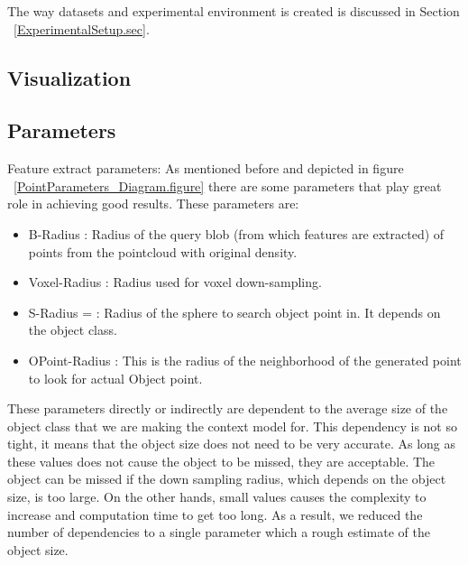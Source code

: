 The way datasets and experimental environment is created is discussed in Section ~\ref{ExperimentalSetup.sec}.


\subsection{Visualization}
\label{visualization.ssec}



\subsection{Parameters}
\label{Parameters.ssec}

Feature extract parameters:
As mentioned before and depicted in figure ~\ref{PointParameters_Diagram.figure} there are some parameters that play great role in
achieving good results. 
These parameters are:

\begin{itemize}
 \item  B-Radius : Radius of the query blob (from which features are extracted) of points from the pointcloud with original
 density.
 \item Voxel-Radius : Radius used for voxel down-sampling. 
 \item S-Radius = : Radius of the sphere to search object point in. 
 It depends on the object class.
 \item OPoint-Radius : This is the radius of the neighborhood of the generated point to look for actual Object point.
\end{itemize}

These parameters directly or indirectly are dependent to the average size of the object class that we are making the context model
for. 
This dependency is not so tight, it means that the object size does not need to be very accurate. 
As long as these values does not cause the object to be missed, they are acceptable.
The object can be missed if the down sampling radius, which depends on the object size, is too large. 
On the other hands, small values causes the complexity to increase and computation time to get too long.  
As a result, we reduced the number of dependencies to a single parameter which a rough estimate of the object size.


